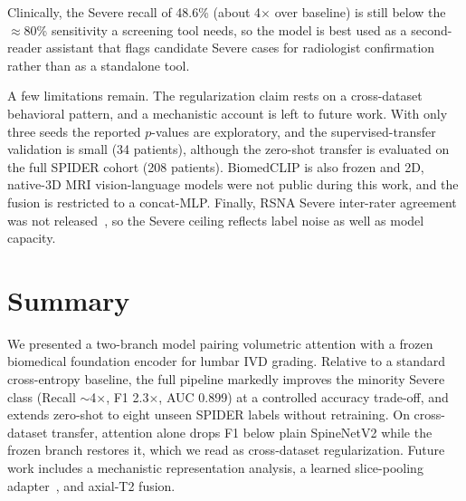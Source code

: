 \documentclass[runningheads]{llncs}
\begin{document}
Clinically, the Severe recall of 48.6\% (about 4$\times$ over baseline) is still below the $\approx$80\% sensitivity a screening tool needs, so the model is best used as a second-reader assistant that flags candidate Severe cases for radiologist confirmation rather than as a standalone tool.

A few limitations remain. The regularization claim rests on a cross-dataset behavioral pattern, and a mechanistic account is left to future work. With only three seeds the reported $p$-values are exploratory, and the supervised-transfer validation is small (34 patients), although the zero-shot transfer is evaluated on the full SPIDER cohort (208 patients). BiomedCLIP is also frozen and 2D, native-3D MRI vision-language models were not public during this work, and the fusion is restricted to a concat-MLP. Finally, RSNA Severe inter-rater agreement was not released~\cite{kaggle2024}, so the Severe ceiling reflects label noise as well as model capacity.

\section{Summary}\label{sec5}

We presented a two-branch model pairing volumetric attention with a frozen biomedical foundation encoder for lumbar IVD grading. Relative to a standard cross-entropy baseline, the full pipeline markedly improves the minority Severe class (Recall $\sim$4$\times$, F1 2.3$\times$, AUC 0.899) at a controlled accuracy trade-off, and extends zero-shot to eight unseen SPIDER labels without retraining. On cross-dataset transfer, attention alone drops F1 below plain SpineNetV2 while the frozen branch restores it, which we read as cross-dataset regularization. Future work includes a mechanistic representation analysis, a learned slice-pooling adapter~\cite{lu2024radclip}, and axial-T2 fusion.

%


\end{document}
